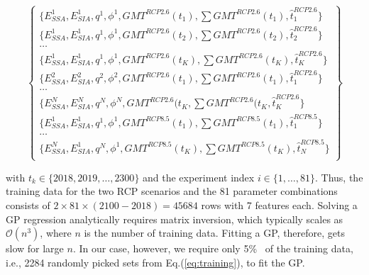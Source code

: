 \documentclass[12pt,a4paper]{article}
\begin{document}
\begin{equation}
\begin{Bmatrix}
\{E_{SSA}^1,E_{SIA}^1,q^1,\phi^1,GMT^{RCP2.6}(t_1),\sum GMT^{RCP2.6}(t_1),\hat{t}^{RCP2.6}_1\} \\
\{E_{SSA}^1,E_{SIA}^1,q^1,\phi^1,GMT^{RCP2.6}(t_2),\sum GMT^{RCP2.6}(t_2),\hat{t}^{RCP2.6}_2\} \\
\ldots \\
\{E_{SSA}^1,E_{SIA}^1,q^1,\phi^1,GMT^{RCP2.6}(t_K),\sum GMT^{RCP2.6}(t_K),\hat{t}^{RCP2.6}_K\} \\
\{E_{SSA}^2,E_{SIA}^2,q^2,\phi^2,GMT^{RCP2.6}(t_1),\sum GMT^{RCP2.6}(t_1),\hat{t}^{RCP2.6}_1\} \\
\ldots \\
\{E_{SSA}^N,E_{SIA}^N,q^N,\phi^N,GMT^{RCP2.6}(t_K,\sum GMT^{RCP2.6}(t_K,\hat{t}^{RCP2.6}_K\} \\
\{E_{SSA}^1,E_{SIA}^1,q^1,\phi^1,GMT^{RCP8.5}(t_1),\sum GMT^{RCP8.5}(t_1),\hat{t}^{RCP8.5}_1\} \\
\ldots \\
\{E_{SSA}^N,E_{SIA}^1,q^N,\phi^1,GMT^{RCP8.5}(t_K),\sum GMT^{RCP8.5}(t_K),\hat{t}^{RCP8.5}_N\} \\
\end{Bmatrix}
\label{eq:training}
\end{equation}

with $t_k \in \{2018,2019,\ldots,2300\}$ and the experiment index $i \in \{1,\ldots,81\}$.
Thus, the training data for the two RCP scenarios and the 81 parameter combinations consists of $2\times81\times(2100-2018)=45684$ rows with 7 features each.
Solving a GP regression analytically requires matrix inversion, which typically scales as $\mathcal{O}(n^3)$, where $n$ is the number of training data.
Fitting a GP, therefore, gets slow for large $n$.
In our case, however, we require only 5\%~ of the training data, i.e., 2284 randomly picked sets from Eq.(\ref{eq:training}), to fit the GP.
\end{document}
